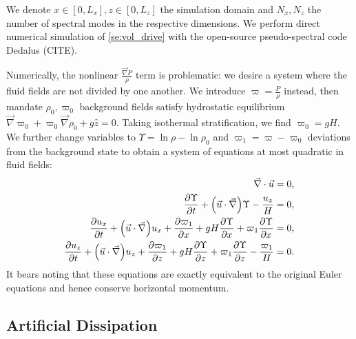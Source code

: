 \documentclass[twocolumn,
        nofootinbib,
        usenames, %
        dvipsnames %
    ]{revtex4-1}%
\newcommand*{\pd}[2]{\frac{\partial#1}{\partial#2}}
\DeclarePairedDelimiter\p{\lparen}{\rparen}
\begin{document}
We denote $x \in [0, L_x], z \in [0, L_z]$ the simulation domain and $N_x, N_z$
the number of spectral modes in the respective dimensions. We perform direct
numerical simulation of \autoref{se:vol_drive} with the open-source
pseudo-spectral code Dedalus (CITE).

Numerically, the nonlinear $\frac{\vec{\nabla}P}{\rho}$ term is problematic: we
desire a system where the fluid fields are not divided by one another. We
introduce $\varpi = \frac{P}{\rho}$ instead, then mandate $\rho_0, \varpi_0$
background fields satisfy hydrostatic equilibrium $\vec{\nabla}\varpi_0 +
\varpi_0 \vec{\nabla}\rho_0 + g\hat{z} = 0$. Taking isothermal stratification,
we find $\varpi_0 = gH$. We further change variables to $\Upsilon = \ln \rho -
\ln \rho_0$ and $\varpi_1 = \varpi - \varpi_0$ deviations from the background
state to obtain a system of equations at most quadratic in fluid fields:
\begin{subequations}\label{se:fc_var}
    \begin{align}
        \vec{\nabla} \cdot \vec{u} &= 0,\\
        \pd{\Upsilon}{t} + \p*{\vec{u} \cdot \vec{\nabla}} \Upsilon
            - \frac{u_z}{H} &= 0,\\
        \pd{u_x}{t} + \p*{\vec{u} \cdot \vec{\nabla}}u_x
            + \pd{\varpi_1}{x} + gH\pd{\Upsilon}{x}
            + \varpi_1 \pd{\Upsilon}{x} &= 0,\\
        \pd{u_z}{t} + \p*{\vec{u} \cdot \vec{\nabla}}u_z
            + \pd{\varpi_1}{z} + gH\pd{\Upsilon}{z}
            + \varpi_1 \pd{\Upsilon}{z} - \frac{\varpi_1}{H} &= 0.
    \end{align}
\end{subequations}
It bears noting that these equations are exactly equivalent to the original
Euler equations and hence conserve horizontal momentum.

\subsection{Artificial Dissipation}
\end{document}
